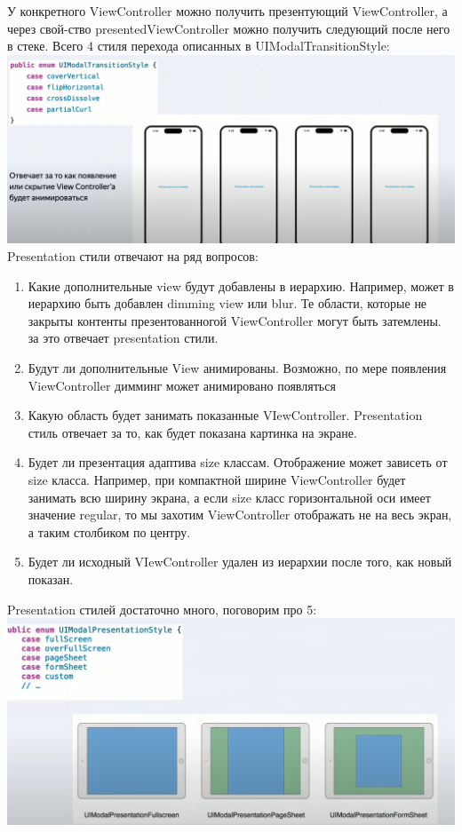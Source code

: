 \documentclass{article}
\begin{document}
    У конкретного ViewController можно получить презентующий ViewController, а через свой-ство presentedViewController можно получить следующий после него в стеке. 
    \newline
    Всего 4 стиля перехода описанных в UIModalTransitionStyle:
    \newline
    \includegraphics[scale = 0.2]{pic/Снимок экрана 2023-08-03 в 19.17.59.png}
    \newline
    Presentation стили отвечают на ряд вопросов: 
    \begin{enumerate}
        \item Какие дополнительные view будут добавлены в иерархию. Например, может в иерархию быть добавлен dimming view или blur. Те области, которые не закрыты контенты презентованногой ViewController могут быть затемлены. за это отвечает presentation стили. 
        \item Будут ли дополнительные View анимированы. Возможно, по мере появления ViewController димминг может анимировано появляться
        \item Какую область будет занимать показанные VIewController. Presentation стиль отвечает за то, как будет показана картинка на экране. 
        \item Будет ли презентация адаптива size классам. Отображение может зависеть от size класса. Например, при компактной ширине ViewController будет занимать всю ширину экрана, а если size класс горизонтальной оси имеет значение regular, то мы захотим ViewController отображать не на весь экран, а таким столбиком по центру. 
        \item Будет ли исходный VIewController удален из иерархии после того, как новый показан. 
    \end{enumerate}
    Presentation стилей достаточно много, поговорим про 5:
    \newline
    \includegraphics[scale = 0.5]{pic/Снимок экрана 2023-08-03 в 19.25.26.png}
\end{document}

